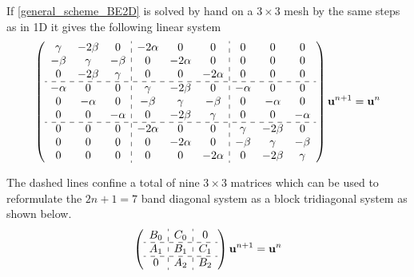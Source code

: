 \noindent If \eqref{general_scheme_BE2D} is solved by hand on a $3\times3$ mesh by the same steps as in 1D it gives the following linear system
\begin{align}\label{linear_system_BE2D}
  \left(\begin{array}{c c c : c c c : c c c}
        \gamma & -2\beta &0 &-2\alpha &0 &0 &0 &0 &0\\
        -\beta & \gamma & -\beta &0 &-2\alpha &0 &0 &0 &0\\
        0&-2\beta & \gamma & 0 & 0 & -2\alpha &0&0&0\\ \hdashline
        -\alpha& 0&0 & \gamma & -2\beta & 0 & -\alpha &0&0\\
        0& -\alpha&0&-\beta & \gamma & -\beta & 0 & -\alpha &0\\
        0& 0& -\alpha&0&-2\beta & \gamma & 0 & 0 &-\alpha\\ \hdashline
        0& 0 &0 &-2\alpha &0&0 & \gamma & -2\beta&0\\
        0& 0 &0 &0 &-2\alpha&0&-\beta & \gamma &-\beta\\
         0&0 &0 &0&0 &-2\alpha&0&-2\beta & \gamma
       \end{array}\right)\mathbf{u}^{n+1} = \mathbf{u}^{n}
\end{align}

\noindent The dashed lines confine a total of nine $3\times 3$ matrices which can be used to reformulate the $2n +1 = 7$ band diagonal system as a block tridiagonal system as shown below.
\begin{align}\label{block_tridiagonal_dashed}
 \left(\begin{array}{c : c : c }
        B_0 & C_0 &0  \\ \hdashline
        A_1 & B_1 & C_1 \\ \hdashline
        0& A_2 & B_2
       \end{array}\right)\mathbf{u}^{n+1} = \mathbf{u}^{n}
\end{align}

